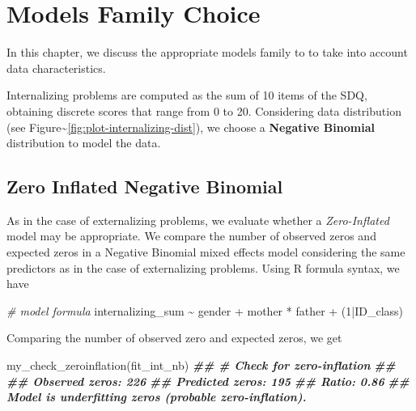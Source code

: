 \documentclass[
]{book}
\newenvironment{Shaded}{\begin{snugshade}}{\end{snugshade}}
\newcommand{\CommentTok}[1]{\textcolor[rgb]{0.56,0.35,0.01}{\textit{#1}}}
\newcommand{\DecValTok}[1]{\textcolor[rgb]{0.00,0.00,0.81}{#1}}
\newcommand{\DocumentationTok}[1]{\textcolor[rgb]{0.56,0.35,0.01}{\textbf{\textit{#1}}}}
\newcommand{\FunctionTok}[1]{\textcolor[rgb]{0.00,0.00,0.00}{#1}}
\newcommand{\NormalTok}[1]{#1}
\newcommand{\SpecialCharTok}[1]{\textcolor[rgb]{0.00,0.00,0.00}{#1}}
\begin{document}
\hypertarget{model-choice-int}{%
\chapter{Models Family Choice}\label{model-choice-int}}

In this chapter, we discuss the appropriate models family to to take into account data characteristics.

Internalizing problems are computed as the sum of 10 items of the SDQ, obtaining discrete scores that range from 0 to 20. Considering data distribution (see Figure\textasciitilde\ref{fig:plot-internalizing-dist}), we choose a \textbf{Negative Binomial} distribution to model the data.

\hypertarget{zero-inflated-negative-binomial-1}{%
\section{Zero Inflated Negative Binomial}\label{zero-inflated-negative-binomial-1}}

As in the case of externalizing problems, we evaluate whether a \emph{Zero-Inflated} model may be appropriate. We compare the number of observed zeros and expected zeros in a Negative Binomial mixed effects model considering the same predictors as in the case of externalizing problems. Using R formula syntax, we have

\begin{Shaded}
\begin{Highlighting}[]
\CommentTok{\# model formula}
\NormalTok{internalizing\_sum }\SpecialCharTok{\textasciitilde{}}\NormalTok{ gender }\SpecialCharTok{+}\NormalTok{ mother }\SpecialCharTok{*}\NormalTok{ father }\SpecialCharTok{+}\NormalTok{ (}\DecValTok{1}\SpecialCharTok{|}\NormalTok{ID\_class)}
\end{Highlighting}
\end{Shaded}

Comparing the number of observed zero and expected zeros, we get

\begin{Shaded}
\begin{Highlighting}[]
\FunctionTok{my\_check\_zeroinflation}\NormalTok{(fit\_int\_nb)}
\DocumentationTok{\#\# \# Check for zero{-}inflation}
\DocumentationTok{\#\# }
\DocumentationTok{\#\#    Observed zeros: 226}
\DocumentationTok{\#\#   Predicted zeros: 195}
\DocumentationTok{\#\#             Ratio: 0.86}
\DocumentationTok{\#\# Model is underfitting zeros (probable zero{-}inflation).}
\end{Highlighting}
\end{Shaded}
\end{document}
